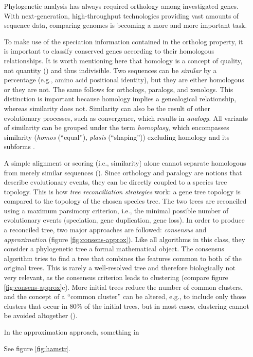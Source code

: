 Phylogenetic analysis has always required orthology among investigated genes.
With next-generation, high-throughput technologies providing vast amounts of
sequence data, comparing genomes is becoming a more and more important task. 

To make use of the speciation information contained in the ortholog property, it
is important to classify conserved genes according to their homologous
relationships. It is worth mentioning here that homology is a concept of
quality, not quantity (\cite{reeck1987}) and thus indivisible. Two sequences can
be \emph{similar} by a percentage (e.g., amino acid positional identity), but
they are either homologous or they are not. The same follows for orthologs,
paralogs, and xenologs. This distinction is important because homology implies a
genealogical relationship, whereas similarity does not. Similarity can also be
the result of other evolutionary processes, such as convergence, which results
in \emph{analogy}. All variants of similarity can be grouped under the term
\emph{homoplasy}, which encompasses similarity (\emph{homos} (``equal''),
\emph{plasis} (``shaping'')) excluding homology and its subforms \cite{page1998}.

A simple alignment or scoring (i.e., similarity) alone cannot separate
homologous from merely similar sequences (\cite{eisen1998}). Since orthology and
paralogy are notions that describe evolutionary events, they can be directly
coupled to a species tree topology. This is how \emph{tree reconciliation
strategies} work: a gene tree topology is compared to the topology of the chosen
species tree. The two trees are reconciled using a maximum parsimony criterion,
i.e., the minimal possible number of evolutionary events (speciation, gene
duplication, gene loss). In order to produce a reconciled tree, two major
approaches are followed: \emph{consensus} and \emph{approximation} (figure
\ref{fig:consens-approx}). Like all algorithms in this class, they consider a
phylogenetic tree a formal mathematical object. The consensus algorithm tries to
find a tree that combines the features common to both of the original trees.
This is rarely a well-resolved tree and therefore biologically not very
relevant, as the consensus criterion leads to clustering (compare figure
\ref{fig:consens-approx}c). More initial trees reduce the number of common
clusters, and the concept of a ``common cluster'' can be altered, e.g., to
include only those clusters that occur in 80\% of the initial trees, but in most
cases, clustering cannot be avoided altogether (\cite{mirkin1995}).

In the approximation approach, 
something in \cite{page1997}



See figure \ref{fig:hamstr}.
